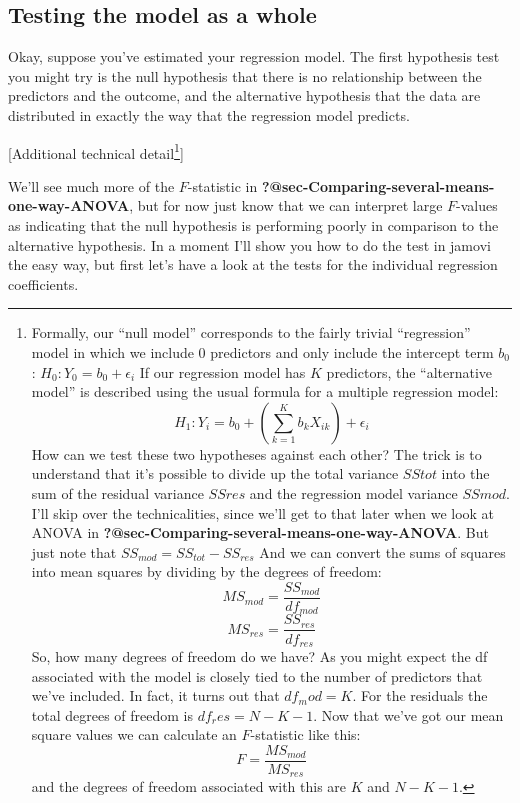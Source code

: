 \documentclass[
  a4paper,
]{book}
\begin{document}
\hypertarget{testing-the-model-as-a-whole}{%
\subsection{Testing the model as a
whole}\label{testing-the-model-as-a-whole}}

Okay, suppose you've estimated your regression model. The first
hypothesis test you might try is the null hypothesis that there is no
relationship between the predictors and the outcome, and the alternative
hypothesis that the data are distributed in exactly the way that the
regression model predicts.

{[}Additional technical detail\footnote{Formally, our ``null model''
  corresponds to the fairly trivial ``regression'' model in which we
  include 0 predictors and only include the intercept term \(b_0\):
  \(H_0:Y_0=b_0+\epsilon_i\) If our regression model has \(K\)
  predictors, the ``alternative model'' is described using the usual
  formula for a multiple regression model:
  \[H_1:Y_i=b_0+(\sum_{k=1}^K b_k X_{ik})+\epsilon_i\] How can we test
  these two hypotheses against each other? The trick is to understand
  that it's possible to divide up the total variance \(SStot\) into the
  sum of the residual variance \(SSres\) and the regression model
  variance \(SSmod\). I'll skip over the technicalities, since we'll get
  to that later when we look at ANOVA in
  \textbf{?@sec-Comparing-several-means-one-way-ANOVA}. But just note
  that \(SS_{mod}=SS_{tot}-SS_{res}\) And we can convert the sums of
  squares into mean squares by dividing by the degrees of freedom:
  \[MS_{mod}=\frac{SS_{mod}}{df_{mod}}\]
  \[MS_{res}=\frac{SS_{res}}{df_{res}}\] So, how many degrees of freedom
  do we have? As you might expect the df associated with the model is
  closely tied to the number of predictors that we've included. In fact,
  it turns out that \(df_mod = K\). For the residuals the total degrees
  of freedom is \(df_res = N - K - 1\). Now that we've got our mean
  square values we can calculate an \(F\)-statistic like this:
  \[F=\frac{MS_{mod}}{MS_{res}}\] and the degrees of freedom associated
  with this are \(K\) and \(N - K - 1\).}{]}

We'll see much more of the \(F\)-statistic in
\textbf{?@sec-Comparing-several-means-one-way-ANOVA}, but for now just
know that we can interpret large \(F\)-values as indicating that the
null hypothesis is performing poorly in comparison to the alternative
hypothesis. In a moment I'll show you how to do the test in jamovi the
easy way, but first let's have a look at the tests for the individual
regression coefficients.
\end{document}

